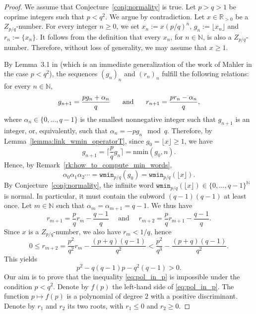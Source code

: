 \documentclass{template_arxiv}
\numberwithin{equation}{section}
\newcommand{\N}{\mathbb N}
\newcommand{\R}{\mathbb R}
\newcommand{\wmin}{\mathtt{wmin}}
\newcommand{\nmin}{\mathrm{nmin}}
\begin{document}
\begin{proof}
We assume that Conjecture~\ref{conj:normality} is true. Let $p>q>1$ be coprime integers such that $p<q^2$. We argue by contradiction. Let $x\in\R_{>0}$ be a $Z_{p/q}$-number. For every integer $n\geq 0$, we set $x_n:=x(p/q)^n$, $g_n:=\lfloor x_n\rfloor$ and $r_n:=\{x_n\}$. It follows from the definition that every $x_n$, for $n \in \N$, is also a $Z_{p/q}$-number. Therefore, without loss of generality, we may assume that $x \geq 1$. 

By Lemma~3.1 in \cite{DM09} (which is an immediate generalization of the work of Mahler in the case $p<q^2$), the sequences $(g_n)_n$ and $(r_n)_n$ fulfill the following relations: for every $n\in\N$,
\begin{equation}\label{eq:mots_de_malher}
g_{n+1}=\frac{pg_n+\alpha_n}{q} \hspace{0.5cm}\text{ and }\hspace{0.5cm} r_{n+1}=\frac{pr_n-\alpha_n}{q},
\end{equation}
where $\alpha_n\in\{0,\ldots,q-1\}$ is the smallest nonnegative integer such that $g_{n+1}$ is an integer, or, equivalently, such that $\alpha_n = -pg_n \mod q$. Therefore, by Lemma~\ref{lemma:link_wmin_operatorT}, since $g_0 = \lfloor x \rfloor \geq 1$, we have 
\[g_{n+1} = \Big\lceil \frac{p}{q}g_n\Big\rceil =\nmin(g_0,n). \]
Hence, by Remark~\ref{rk:how_to_compute_min_words}, 
\[\alpha_0\alpha_1\alpha_2\cdots = \wmin_{p/q}(g_0) = 
\wmin_{p/q}(\lfloor x \rfloor).\]
By Conjecture~\ref{conj:normality}, the infinite word $\wmin_{p/q}(\lfloor x\rfloor)\in\{0,\ldots,q-1\}^\N$ is normal. In particular, it must contain the subword $(q-1)(q-1)$ at least once. Let $m\in\N$ such that $\alpha_m=\alpha_{m+1}=q-1$. We thus have
\begin{equation}\label{eq:rm}
r_{m+1}=\frac{p}{q}r_m-\frac{q-1}{q} \quad\text{ and }\quad r_{m+2}=\frac{p}{q}r_{m+1}-\frac{q-1}{q}.
\end{equation}
Since $x$ is a $Z_{p/q}$-number, we also have  $r_m<1/q$, hence
\[
 0\leq r_{m+2}=\frac{p^2}{q^2}r_m-\frac{(p+q)(q-1)}{q^2}<\frac{p^2}{q^3}-\frac{(p+q)(q-1)}{q^2}.
\]
This yields
\begin{equation}\label{eq:pol_in_p}
p^2-q(q-1)p-q^2(q-1)>0.\end{equation}
Our aim is to prove that the inequality \eqref{eq:pol_in_p} is impossible under the condition $p<q^2$. Denote by $f(p)$ the left-hand side of \eqref{eq:pol_in_p}. The function $p\mapsto f(p)$ is a polynomial of degree $2$ with a positive discriminant. Denote by $r_1$ and $r_2$ its two roots, with $r_1\leq 0$ and $r_2\geq 0$.


\end{proof}
\end{document}
